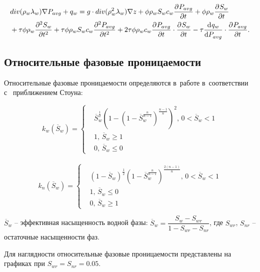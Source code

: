 \begin{equation} \label{eq:mod_saturation}
 \begin{aligned}
  & div (\rho_w\lambda_w) \nabla P_{avg} + q_w = g \cdot div (\rho_w^2\lambda_w) \nabla z + \phi \rho_w S_w c_w  \pd{P_{avg}}{t}
  + \phi \rho_w \pd{S_w}{t} \\
  & + \tau \phi \rho_w \pd[2]{S_w}{t} + \tau \phi \rho_w S_w c_w \pd[2]{P_{avg}}{t}
  + 2 \tau \phi \rho_w c_w \pd{P_{avg}}{t} \cdot \pd{S_w}{t} - \tau \dd{q_w}{P_{avg}} \cdot \pd{P_{avg}}{t}.
 \end{aligned}
\end{equation}

\subsection{Относительные фазовые проницаемости}
Относительные фазовые проницаемости определяются в~работе в~соответствии с~
приближением Стоуна\cite{Aziz-Settari}:

\begin{equation*}
  k_{w}(\overline{S}_w)=
  \begin{cases}
  &\overline{S}_w^\frac{1}{2} \left( 1-\left( 1-\overline{S}_w^\frac{n}{n-1} \right) ^\frac{n-1}{n} \right) ^2,
  \, 0<\overline{S}_w<1 \\
  &1, \,\overline{S}_w\ge 1\\
  &0, \,\overline{S}_w\le 0
\end{cases} 
\end{equation*}
\\
\begin{equation*}
  k_{n}(\overline{S}_w)=
  \begin{cases}
  &(1-\overline{S}_w)^\frac{1}{2} \left(1-\overline{S}_w^\frac{n}{n-1} \right) ^\frac{2(n-1)}{n},
  \, 0<\overline{S}_w<1\\
  &1, \,\overline{S}_w\le 0\\
  &0, \, \overline{S}_w\ge 1
  \end{cases}
\end{equation*}

$\overline{S}_w$ -- эффективная насыщенность водной фазы:
$\overline{S}_w={\dfrac{S_w-S_{wr}}{1-S_{wr}-S_{nr}}}$, где $S_{wr}$,
$S_{nr}$ -- остаточные насыщенности фаз.

Для наглядности относительные фазовые проницаемости представлены на графиках при $S_{wr}=S_{nr}=0.05$.

